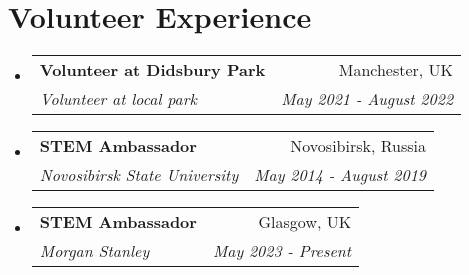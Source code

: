 \documentclass[a4paper,12pt]{extarticle}
\makeatletter
\newcommand{\resumeSubheading}[4]{
  \vspace{-1pt}\item
    \begin{tabular*}{0.97\textwidth}{l@{\extracolsep{\fill}}r}
      \textbf{#1} & #2 \\
      \textit{#3} & \textit{#4} \\
    \end{tabular*}\vspace{-5pt}
}
\newcommand{\resumeSubHeadingListStart}{\begin{itemize}[leftmargin=*]}
\newcommand{\resumeSubHeadingListEnd}{\end{itemize}}
\makeatother
\begin{document}
\vspace{-10pt}
\section{Volunteer Experience}
  \resumeSubHeadingListStart
	\resumeSubheading
    {Volunteer at Didsbury Park}{Manchester, UK}
    {Volunteer at local park}{May 2021 - August 2022}
	\resumeSubheading
    {STEM Ambassador}{Novosibirsk, Russia}
    {Novosibirsk State University}{May 2014 - August 2019}
  \resumeSubheading
    {STEM Ambassador}{Glasgow, UK}
    {Morgan Stanley}{May 2023 - Present}

\resumeSubHeadingListEnd
\end{document}
